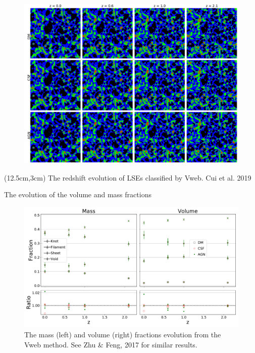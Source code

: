 \documentclass[aspectratio=169]{beamer}
\begin{document}
\begin{frame}[plain,t]
\vspace{-0.3cm}
  \begin{figure}
  \hspace{-3cm}
    \includegraphics[height=\textheight]{Evolution-illustriation}
  \end{figure}
\begin{textblock*}{3.5cm}(12.5cm,3cm)
The redshift evolution of LSEs classified by Vweb. Cui et al. 2019
\end{textblock*}
\end{frame}

\begin{frame}{The evolution of the volume and mass fractions}
\vspace{-0.3cm}
  \begin{figure}
    \includegraphics[height=0.9\textheight]{MV-fractions-vweb.pdf}
    \caption{The mass (left) and volume (right) fractions evolution from the Vweb method. See Zhu \& Feng, 2017 for similar results.}
  \end{figure}
\end{frame}
\end{document}
